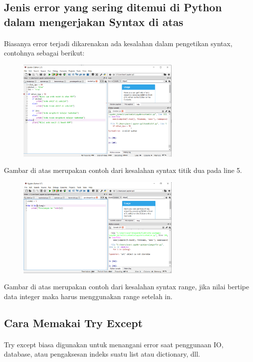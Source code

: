 \subsection{Jenis error yang sering ditemui di Python dalam mengerjakan Syntax di atas}
\paragraph{}
        Biasanya error terjadi dikarenakan ada kesalahan dalam pengetikan syntax, contohnya sebagai berikut:
        \begin{figure}[h]
        \centerline{\includegraphics[width=8cm]{gambar/errortitikdua.PNG}}
        \end{figure}
        \par Gambar di atas merupakan contoh dari kesalahan syntax titik dua pada line 5.
        \begin{figure}[h]
        \centerline{\includegraphics[width=8cm]{gambar/range.PNG}}
        \end{figure}
        \par Gambar di atas merupakan contoh dari kesalahan syntax range, jika nilai bertipe data integer maka harus menggunakan range setelah in.

\subsection{Cara Memakai Try Except}
\paragraph{}
        Try except biasa digunakan untuk menangani error saat penggunaan IO, database, atau pengaksesan indeks suatu list atau dictionary, dll.
